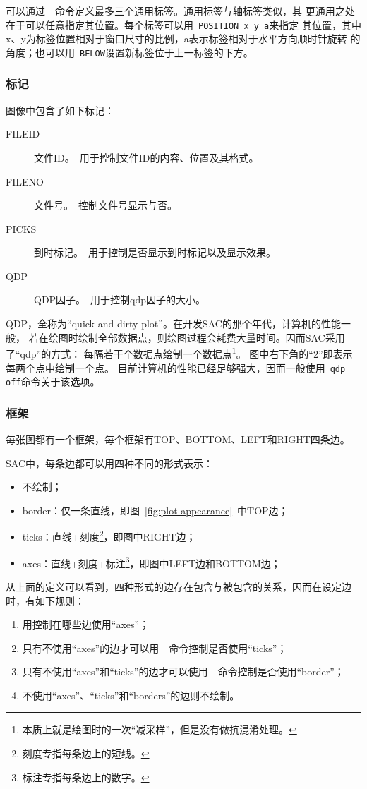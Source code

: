 可以通过~~命令定义最多三个通用标签。通用标签与轴标签类似，其
更通用之处在于可以任意指定其位置。每个标签可以用~\verb+POSITION x y a+来指定
其位置，其中x、y为标签位置相对于窗口尺寸的比例，a表示标签相对于水平方向顺时针旋转
的角度；也可以用~\verb+BELOW+设置新标签位于上一标签的下方。

\subsubsection{标记}
图像中包含了如下标记：
\begin{description}
\item [FILEID] 文件ID。~用于控制文件ID的内容、位置及其格式。
\item [FILENO] 文件号。~控制文件号显示与否。
\item [PICKS] 到时标记。~用于控制是否显示到时标记以及显示效果。
\item [QDP] QDP因子。~用于控制qdp因子的大小。
\end{description}

QDP，全称为``quick and dirty plot''。在开发SAC的那个年代，计算机的性能一般，
若在绘图时绘制全部数据点，则绘图过程会耗费大量时间。因而SAC采用了``qdp''的方式：
每隔若干个数据点绘制一个数据点\footnote{本质上就是绘图时的一次``减采样''，但是没有做抗混淆处理。}。
图中右下角的``2''即表示每两个点中绘制一个点。
目前计算机的性能已经足够强大，因而一般使用~\verb+qdp off+命令关于该选项。

\subsubsection{框架}
每张图都有一个框架，每个框架有TOP、BOTTOM、LEFT和RIGHT四条边。

SAC中，每条边都可以用四种不同的形式表示：
\begin{itemize}
\item 不绘制；
\item border：仅一条直线，即图~\ref{fig:plot-appearance}~中TOP边；
\item ticks：直线+刻度\footnote{刻度专指每条边上的短线。}，即图中RIGHT边；
\item axes：直线+刻度+标注\footnote{标注专指每条边上的数字。}，即图中LEFT边和BOTTOM边；
\end{itemize}

从上面的定义可以看到，四种形式的边存在包含与被包含的关系，因而在设定边时，有如下规则：
\begin{enumerate}
\item 用控制在哪些边使用``axes''；
\item 只有不使用``axes''的边才可以用~~命令控制是否使用``ticks''；
\item 只有不使用``axes''和``ticks''的边才可以使用~~命令控制是否使用``border''；
\item 不使用``axes''、``ticks''和``borders''的边则不绘制。
\end{enumerate}

